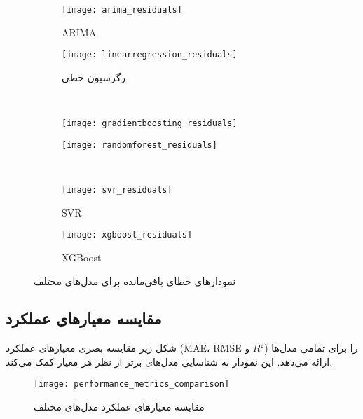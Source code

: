 \begin{figure}[H]
	\centering
	\begin{subfigure}{0.48\textwidth}
		\centering
		\texttt{[image: arima\_residuals]}
		\caption{ARIMA}
		\label{fig:arima_residuals}
	\end{subfigure}
	\hfill
	\begin{subfigure}{0.48\textwidth}
		\centering
		\texttt{[image: linearregression\_residuals]}
		\caption{رگرسیون خطی}
		\label{fig:linearregression_residuals}
	\end{subfigure}
	\\
	\begin{subfigure}{0.48\textwidth}
		\centering
		\texttt{[image: gradientboosting\_residuals]}
		\caption{}
		\label{fig:gradientboosting_residuals}
	\end{subfigure}
	\hfill
	\begin{subfigure}{0.48\textwidth}
		\centering
		\texttt{[image: randomforest\_residuals]}
		\caption{}
		\label{fig:randomforest_residuals}
	\end{subfigure}
	\\
	\begin{subfigure}{0.48\textwidth}
		\centering
		\texttt{[image: svr\_residuals]}
		\caption{SVR}
		\label{fig:svr_residuals}
	\end{subfigure}
	\hfill
	\begin{subfigure}{0.48\textwidth}
		\centering
		\texttt{[image: xgboost\_residuals]}
		\caption{XGBoost}
		\label{fig:xgboost_residuals}
	\end{subfigure}
	\caption{نمودارهای خطای باقی‌مانده برای مدل‌های مختلف}
	\label{fig:residual_plots}
\end{figure}



\subsection{مقایسه معیارهای عملکرد}
شکل زیر مقایسه بصری معیارهای عملکرد (MAE، RMSE و \( R^2 \)) را برای تمامی مدل‌ها ارائه می‌دهد. این نمودار به شناسایی مدل‌های برتر از نظر هر معیار کمک می‌کند.

\begin{figure}[H]
	\centering
	\texttt{[image: performance\_metrics\_comparison]}
	\caption{مقایسه معیارهای عملکرد مدل‌های مختلف}
	\label{fig:performance_metrics_comparison}
\end{figure}

